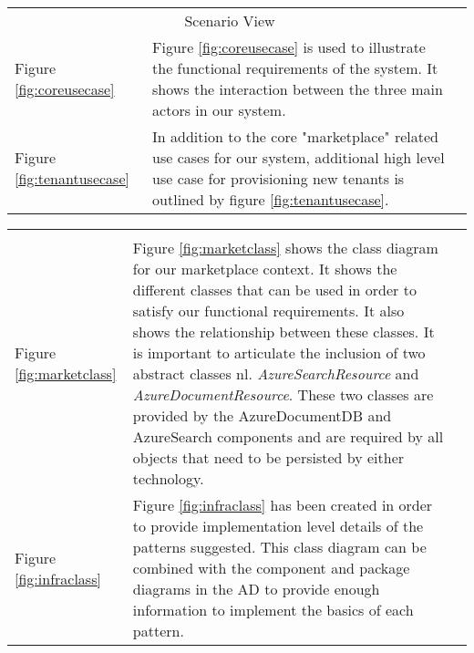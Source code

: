 \begin{table}[htp]
\centering
\begin{tabularx}{\textwidth}{lXl}
\cline{1-2}
\multicolumn{2}{|c|}{\cellcolor[HTML]{EFEFEF}Scenario View} &  \\ \cline{1-2}
\multicolumn{1}{|l|}{Figure \ref{fig:coreusecase}} & \multicolumn{1}{X|}{Figure \ref{fig:coreusecase} is used to illustrate the functional requirements of the system. It shows the interaction between the three main actors in our system.} &  \\ \cline{1-2}
\multicolumn{1}{|l|}{Figure \ref{fig:tenantusecase}} & \multicolumn{1}{X|}{In addition to the core "marketplace" related use cases for our system, additional high level use case for provisioning new tenants is outlined by figure \ref{fig:tenantusecase}.} & \\
\cline{1-2}
\end{tabularx}
\label{tab:scenarioview}
\end{table}

\begin{table}[htp]
\centering
\begin{tabularx}{\textwidth}{lXl}
\cline{1-2}
\multicolumn{2}{|c|}{\cellcolor[HTML]{EFEFEF}{\color[HTML]{000000} Logical View}} &  \\ \cline{1-2}
\multicolumn{1}{|l|}{Figure \ref{fig:marketclass}} & \multicolumn{1}{X|}{Figure \ref{fig:marketclass} shows the class diagram for our marketplace context. It shows the different classes that can be used in order to satisfy our functional requirements. It also shows the relationship between these classes. It is important to articulate the inclusion of two abstract classes nl. \textit{AzureSearchResource} and \textit{AzureDocumentResource}. These two classes are provided by the AzureDocumentDB and AzureSearch components and are required by all objects that need to be persisted by either technology.} &  \\ \cline{1-2}
\multicolumn{1}{|l|}{Figure \ref{fig:infraclass}} & \multicolumn{1}{X|}{Figure \ref{fig:infraclass} has been created in order to provide implementation level details of the patterns suggested. This class diagram can be combined with the component and package diagrams in the AD to provide enough information to implement the basics of each pattern.} &  \\ \cline{1-2}
\cline{1-2}
\end{tabularx}
\label{tab:logicalview}
\end{table}

